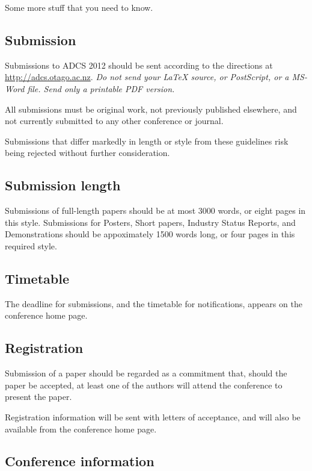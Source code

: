 \documentclass[twocolumn]{article}
\begin{document}
Some more stuff that you need to know.

\subsection{Submission}

Submissions to ADCS 2012 should be sent according to the directions at
\url{http://adcs.otago.ac.nz}.  \emph{Do not send your {\LaTeX}
  source, or PostScript, or a MS-Word file.  Send only a printable PDF
  version.}

All submissions must be original work, not previously published 
elsewhere, and not currently submitted to any other conference or
journal.

Submissions that differ markedly in length or style from these
guidelines risk being rejected without further consideration.

\subsection{Submission length}

Submissions of full-length papers should be at most 3000 words, or
eight pages in this style.  Submissions for Posters, Short papers,
Industry Status Reports, and Demonstrations should be appoximately
1500 words long, or four pages in this required style.

\subsection{Timetable}

The deadline for submissions, and the timetable for notifications,
appears on the conference home page.

\subsection{Registration}

Submission of a paper should be regarded as a commitment that, should
the paper be accepted, at least one of the authors will attend the
conference to present the paper.

Registration information will be sent with letters of acceptance, and
will also be available from the conference home page.

\subsection{Conference information}
\end{document}
